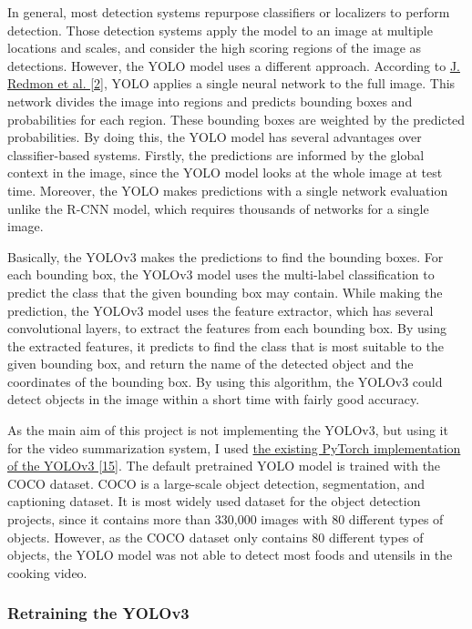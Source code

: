 \documentclass{article}
\begin{document}
In general, most detection systems repurpose classifiers or localizers to perform detection. Those detection systems apply the model to an image at multiple locations and scales, and consider the high scoring regions of the image as detections. However, the YOLO model uses a different approach. According to \hyperlink{ref2}{J. Redmon et al. [2]}, YOLO applies a single neural network to the full image. This network divides the image into regions and predicts bounding boxes and probabilities for each region. These bounding boxes are weighted by the predicted probabilities. By doing this, the YOLO model has several advantages over classifier-based systems. Firstly, the predictions are informed by the global context in the image, since the YOLO model looks at the whole image at test time. Moreover, the YOLO makes predictions with a single network evaluation unlike the R-CNN model, which requires thousands of networks for a single image.

Basically, the YOLOv3 makes the predictions to find the bounding boxes. For each bounding box, the YOLOv3 model uses the multi-label classification to predict the class that the given bounding box may contain. While making the prediction, the YOLOv3 model uses the feature extractor, which has several convolutional layers, to extract the features from each bounding box. By using the extracted features, it predicts to find the class that is most suitable to the given bounding box, and return the name of the detected object and the coordinates of the bounding box. By using this algorithm, the YOLOv3 could detect objects in the image within a short time with fairly good accuracy.

As the main aim of this project is not implementing the YOLOv3, but using it for the video summarization system, I used \hyperlink{ref15}{the existing PyTorch implementation of the YOLOv3 [15]}. The default pretrained YOLO model is trained with the COCO dataset. COCO is a large-scale object detection, segmentation, and captioning dataset. It is most widely used dataset for the object detection projects, since it contains more than 330,000 images with 80 different types of objects. However, as the COCO dataset only contains 80 different types of objects, the YOLO model was not able to detect most foods and utensils in the cooking video.

\subsubsection{Retraining the YOLOv3}
\end{document}
